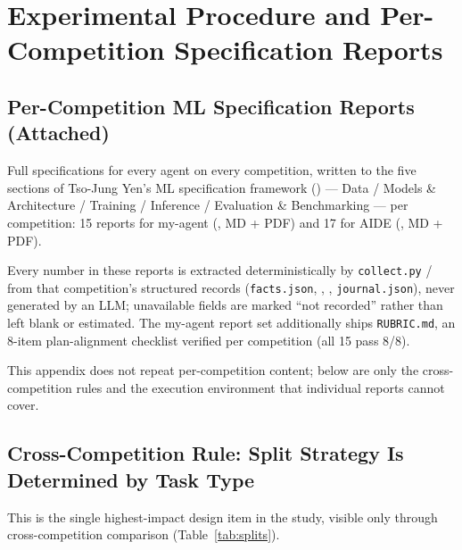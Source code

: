 \documentclass[11pt,a4paper]{article}
\begin{document}
\appendix

\section{Experimental Procedure and Per-Competition Specification Reports}
\label{app:specs}

\subsection{Per-Competition ML Specification Reports (Attached)}

Full specifications for every agent on every competition, written to the five sections of Tso-Jung Yen's ML specification framework () --- Data / Models \& Architecture / Training / Inference / Evaluation \& Benchmarking --- per competition: 15 reports for my-agent (\href{https://github.com/930731haohao-afk/kaggle-agent/tree/main/docs/ml_specs}{}, MD + PDF) and 17 for AIDE (\href{https://github.com/930731haohao-afk/kaggle-agent/tree/main/benchmark_results/ml_specs_aide}{}, MD + PDF).

Every number in these reports is extracted deterministically by \texttt{collect.py} /  from that competition's structured records (\texttt{facts.json}, , , \texttt{journal.json}), never generated by an LLM; unavailable fields are marked ``not recorded'' rather than left blank or estimated. The my-agent report set additionally ships \texttt{RUBRIC.md}, an 8-item plan-alignment checklist verified per competition (all 15 pass 8/8).

This appendix does not repeat per-competition content; below are only the cross-competition rules and the execution environment that individual reports cannot cover.

\subsection{Cross-Competition Rule: Split Strategy Is Determined by Task Type}

This is the single highest-impact design item in the study, visible only through cross-competition comparison (Table~\ref{tab:splits}).
\end{document}
